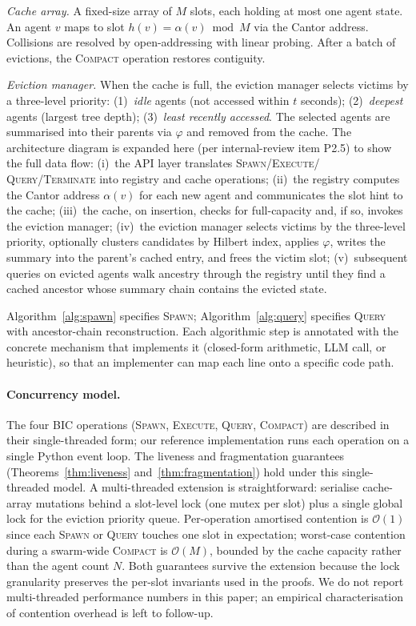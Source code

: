 \documentclass[fleqn,10pt]{article}
\theoremstyle{definition}
\newcommand{\summarize}{\varphi}
\newcommand{\cantor}{\alpha}
\newcommand{\Oh}{\mathcal{O}}
\newcommand{\slots}{M}
\begin{document}
\emph{Cache array.} A fixed-size array of $\slots$ slots, each
holding at most one agent state. An agent $v$ maps to slot
$h(v) = \cantor(v) \bmod \slots$ via the Cantor address. Collisions
are resolved by open-addressing with linear probing. After a batch of
evictions, the \textsc{Compact} operation restores contiguity.

\emph{Eviction manager.} When the cache is full, the eviction
manager selects victims by a three-level priority: (1)~\emph{idle}
agents (not accessed within $t$ seconds); (2)~\emph{deepest} agents
(largest tree depth); (3)~\emph{least recently accessed}. The
selected agents are summarised into their parents via $\summarize$
and removed from the cache. The architecture diagram is expanded
here (per internal-review item P2.5) to show the full data flow:
(i)~the API layer translates \textsc{Spawn}/\textsc{Execute}/
\textsc{Query}/\textsc{Terminate} into registry and cache
operations; (ii)~the registry computes the Cantor address
$\cantor(v)$ for each new agent and communicates the slot hint to
the cache; (iii)~the cache, on insertion, checks for full-capacity
and, if so, invokes the eviction manager; (iv)~the eviction manager
selects victims by the three-level priority, optionally clusters
candidates by Hilbert index, applies $\summarize$, writes the
summary into the parent's cached entry, and frees the victim slot;
(v)~subsequent queries on evicted agents walk ancestry through the
registry until they find a cached ancestor whose summary chain
contains the evicted state.

Algorithm~\ref{alg:spawn} specifies \textsc{Spawn};
Algorithm~\ref{alg:query} specifies \textsc{Query} with
ancestor-chain reconstruction. Each algorithmic step is annotated with
the concrete mechanism that implements it (closed-form arithmetic,
LLM call, or heuristic), so that an implementer can map each line
onto a specific code path.

\paragraph{Concurrency model.}
The four BIC operations (\textsc{Spawn}, \textsc{Execute},
\textsc{Query}, \textsc{Compact}) are described in their
single-threaded form; our reference implementation runs each
operation on a single Python event loop. The liveness and
fragmentation guarantees (Theorems~\ref{thm:liveness}
and~\ref{thm:fragmentation}) hold under this single-threaded model.
A multi-threaded extension is straightforward: serialise cache-array
mutations behind a slot-level lock (one mutex per slot) plus a
single global lock for the eviction priority queue. Per-operation
amortised contention is $\Oh(1)$ since each \textsc{Spawn} or
\textsc{Query} touches one slot in expectation; worst-case
contention during a swarm-wide \textsc{Compact} is $\Oh(\slots)$,
bounded by the cache capacity rather than the agent count $N$. Both
guarantees survive the extension because the lock granularity
preserves the per-slot invariants used in the proofs. We do not
report multi-threaded performance numbers in this paper; an
empirical characterisation of contention overhead is left to
follow-up.
\end{document}
